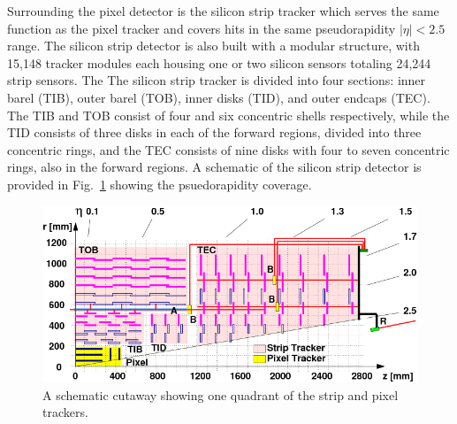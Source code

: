 Surrounding the pixel detector is the silicon strip tracker \cite{SiliconStrip} which serves the same function as the pixel tracker and covers hits in the same pseudorapidity $|\eta|<2.5$ range. The silicon strip detector is also built with a modular structure, with 15,148 tracker modules each housing one or two silicon sensors totaling 24,244 strip sensors. The  The silicon strip tracker is divided into four sections: inner barel (TIB), outer barel (TOB), inner disks (TID), and outer endcaps (TEC). The TIB and TOB consist of four and six concentric shells respectively, while the TID consists of three disks in each of the forward regions, divided into three concentric rings, and the TEC consists of nine disks with four to seven concentric rings, also in the forward regions. A schematic of the silicon strip detector is provided in Fig.~\ref{fig:StripDiagram} showing the psuedorapidity coverage.

\begin{figure}[H]
    \centering
    \includegraphics[width=\textwidth]{Images/CMS/TrackerQuadrant.png}
    \caption{A schematic cutaway showing one quadrant of the strip and pixel trackers.}
    \label{fig:StripDiagram}
\end{figure}